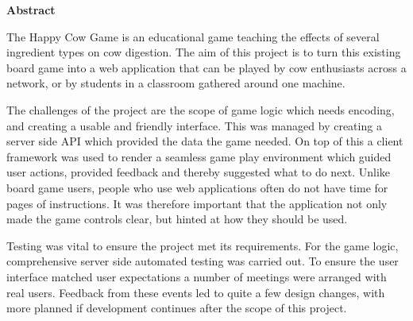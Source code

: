 \thispagestyle{empty}

\begin{center}
    {\LARGE\bf Abstract}
\end{center}

The Happy Cow Game is an educational game teaching the effects of several ingredient types on cow digestion. The aim of this project is to turn this existing board game into a web application that can be played by cow enthusiasts across a network, or by students in a classroom gathered around one machine.

The challenges of the project are the scope of game logic which needs encoding, and creating a usable and friendly interface. This was managed by creating a server side API which provided the data the game needed. On top of this a client framework was used to render a seamless game play environment which guided user actions, provided feedback and thereby suggested what to do next. Unlike board game users, people who use web applications often do not have time for pages of instructions. It was therefore important that the application not only made the game controls clear, but hinted at how they should be used.

Testing was vital to ensure the project met its requirements. For the game logic, comprehensive server side automated testing was carried out. To ensure the user interface matched user expectations a number of meetings were arranged with real users. Feedback from these events led to quite a few design changes, with more planned if development continues after the scope of this project.
